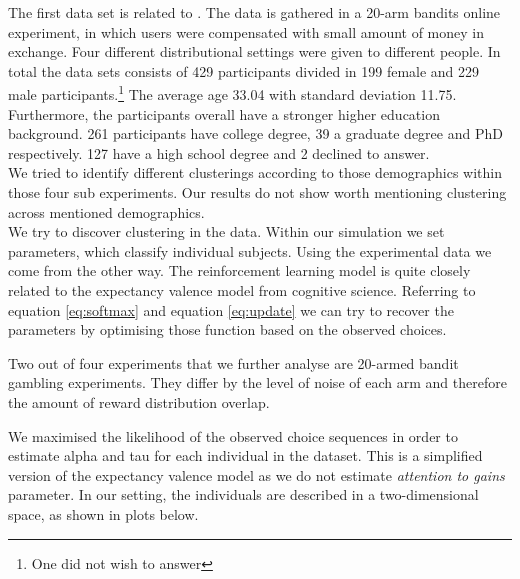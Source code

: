 \documentclass[12pt,a4paper,bibliography=totocnumbered,listof=totocnumbered]{scrartcl}
\begin{document}
The first data set is related to \cite{Stojic2015}. The data is gathered in a 20-arm bandits online experiment, in which users were compensated with small amount of money in exchange. Four different distributional settings were given to different people. In total the data sets consists of 429 participants divided in 199 female and 229 male participants.\footnote{One did not wish to answer} The average age 33.04 with standard deviation 11.75. Furthermore, the participants overall have a stronger higher education background. 261 participants have college degree, 39 a graduate degree and PhD respectively. 127 have a high school degree and 2 declined to answer.\\
We tried to identify different clusterings according to those demographics within those four sub experiments. Our results do not show worth mentioning clustering across mentioned demographics.\\
We try to discover clustering in the data. Within our simulation we set parameters, which classify individual subjects. Using the experimental data we come from the other way. The reinforcement learning model is quite closely related to the expectancy valence model from cognitive science. Referring to equation \eqref{eq:softmax} and equation \eqref{eq:update} we can try to recover the parameters by optimising those function based on the observed choices.

Two out of four experiments that we further analyse are 20-armed bandit gambling experiments. They differ by the level of noise of each arm and therefore the amount of reward distribution overlap.

We maximised the likelihood of the observed choice sequences in order to estimate alpha and tau for each individual in the dataset. This is a simplified version of the expectancy valence model as we do not estimate \textit{attention to gains} parameter. In our setting, the individuals are described in a two-dimensional space, as shown in plots below.
\end{document}
